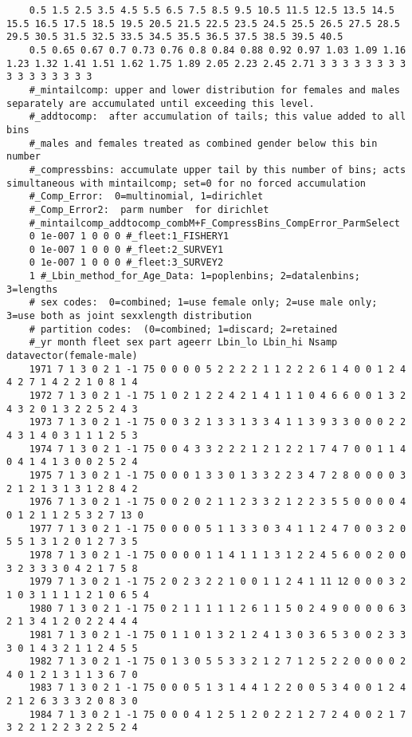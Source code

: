 \begin{landscape}
{\begin{verbatim}
	0.5 1.5 2.5 3.5 4.5 5.5 6.5 7.5 8.5 9.5 10.5 11.5 12.5 13.5 14.5 15.5 16.5 17.5 18.5 19.5 20.5 21.5 22.5 23.5 24.5 25.5 26.5 27.5 28.5 29.5 30.5 31.5 32.5 33.5 34.5 35.5 36.5 37.5 38.5 39.5 40.5
	0.5 0.65 0.67 0.7 0.73 0.76 0.8 0.84 0.88 0.92 0.97 1.03 1.09 1.16 1.23 1.32 1.41 1.51 1.62 1.75 1.89 2.05 2.23 2.45 2.71 3 3 3 3 3 3 3 3 3 3 3 3 3 3 3 3
	#_mintailcomp: upper and lower distribution for females and males separately are accumulated until exceeding this level.
	#_addtocomp:  after accumulation of tails; this value added to all bins
	#_males and females treated as combined gender below this bin number 
	#_compressbins: accumulate upper tail by this number of bins; acts simultaneous with mintailcomp; set=0 for no forced accumulation
	#_Comp_Error:  0=multinomial, 1=dirichlet
	#_Comp_Error2:  parm number  for dirichlet
	#_mintailcomp_addtocomp_combM+F_CompressBins_CompError_ParmSelect
	0 1e-007 1 0 0 0 #_fleet:1_FISHERY1
	0 1e-007 1 0 0 0 #_fleet:2_SURVEY1
	0 1e-007 1 0 0 0 #_fleet:3_SURVEY2
	1 #_Lbin_method_for_Age_Data: 1=poplenbins; 2=datalenbins; 3=lengths
	# sex codes:  0=combined; 1=use female only; 2=use male only; 3=use both as joint sexxlength distribution
	# partition codes:  (0=combined; 1=discard; 2=retained
	#_yr month fleet sex part ageerr Lbin_lo Lbin_hi Nsamp datavector(female-male)
	1971 7 1 3 0 2 1 -1 75 0 0 0 0 5 2 2 2 2 1 1 2 2 2 6 1 4 0 0 1 2 4 4 2 7 1 4 2 2 1 0 8 1 4
	1972 7 1 3 0 2 1 -1 75 1 0 2 1 2 2 4 2 1 4 1 1 1 0 4 6 6 0 0 1 3 2 4 3 2 0 1 3 2 2 5 2 4 3
	1973 7 1 3 0 2 1 -1 75 0 0 3 2 1 3 3 1 3 3 4 1 1 3 9 3 3 0 0 0 2 2 4 3 1 4 0 3 1 1 1 2 5 3
	1974 7 1 3 0 2 1 -1 75 0 0 4 3 3 2 2 2 1 2 1 2 2 1 7 4 7 0 0 1 1 4 0 4 1 4 1 3 0 0 2 5 2 4
	1975 7 1 3 0 2 1 -1 75 0 0 0 1 3 3 0 1 3 3 2 2 3 4 7 2 8 0 0 0 0 3 2 1 2 1 3 1 3 1 2 8 4 2
	1976 7 1 3 0 2 1 -1 75 0 0 2 0 2 1 1 2 3 3 2 1 2 2 3 5 5 0 0 0 0 4 0 1 2 1 1 2 5 3 2 7 13 0
	1977 7 1 3 0 2 1 -1 75 0 0 0 0 5 1 1 3 3 0 3 4 1 1 2 4 7 0 0 3 2 0 5 5 1 3 1 2 0 1 2 7 3 5
	1978 7 1 3 0 2 1 -1 75 0 0 0 0 1 1 4 1 1 1 3 1 2 2 4 5 6 0 0 2 0 0 3 2 3 3 3 0 4 2 1 7 5 8
	1979 7 1 3 0 2 1 -1 75 2 0 2 3 2 2 1 0 0 1 1 2 4 1 11 12 0 0 0 3 2 1 0 3 1 1 1 1 2 1 0 6 5 4
	1980 7 1 3 0 2 1 -1 75 0 2 1 1 1 1 1 2 6 1 1 5 0 2 4 9 0 0 0 0 6 3 2 1 3 4 1 2 0 2 2 4 4 4
	1981 7 1 3 0 2 1 -1 75 0 1 1 0 1 3 2 1 2 4 1 3 0 3 6 5 3 0 0 2 3 3 3 0 1 4 3 2 1 1 2 4 5 5
	1982 7 1 3 0 2 1 -1 75 0 1 3 0 5 5 3 3 2 1 2 7 1 2 5 2 2 0 0 0 0 2 4 0 1 2 1 3 1 1 3 6 7 0
	1983 7 1 3 0 2 1 -1 75 0 0 0 5 1 3 1 4 4 1 2 2 0 0 5 3 4 0 0 1 2 4 2 1 2 6 3 3 3 2 0 8 3 0
	1984 7 1 3 0 2 1 -1 75 0 0 0 4 1 2 5 1 2 0 2 2 1 2 7 2 4 0 0 2 1 7 3 2 2 1 2 2 3 2 2 5 2 4

\end{verbatim}}
\end{landscape}
